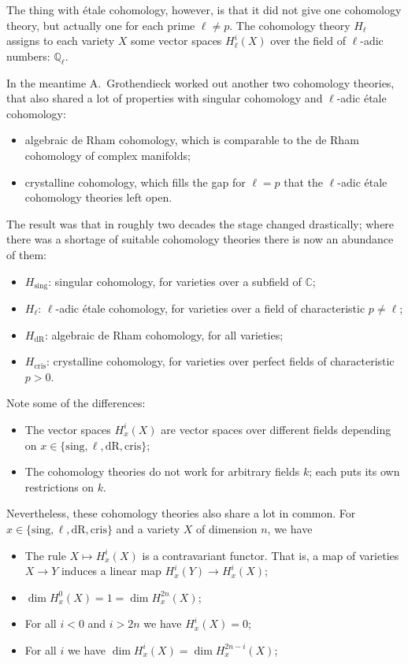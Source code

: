 \documentclass[a4paper,10pt]{article}
\begin{document}
The thing with \'{e}tale cohomology, however, is that it did not give one
cohomology theory, but actually one for each prime $\ell \ne p$. The cohomology
theory $H_{\ell}$ assigns to each variety $X$ some vector spaces
$H_{\ell}^{i}(X)$ over the field of $\ell$-adic numbers: $\mathbb{Q}_{\ell}$.

In the meantime A.~Grothendieck worked out another two cohomology theories,
that also shared a lot of properties with singular cohomology and $\ell$-adic
\'{e}tale cohomology:
\begin{itemize} %
	\item algebraic de Rham cohomology, which is comparable to the de Rham
		cohomology of complex manifolds;
	\item crystalline cohomology, which fills the gap for $\ell = p$ that
		the $\ell$-adic \'{e}tale cohomology theories left open.
\end{itemize} %
The result was that in roughly two decades the stage changed drastically; where
there was a shortage of suitable cohomology theories there is now an abundance
of them:
\begin{itemize} %
	\item $H_{\mathrm{sing}}$: singular cohomology, for varieties over a
		subfield of $\mathbb{C}$;
	\item $H_{\ell}$: $\ell$-adic \'{e}tale cohomology, for varieties over
		a field of characteristic $p \ne \ell$;
	\item $H_{\mathrm{dR}}$: algebraic de Rham cohomology, for all
		varieties;
	\item $H_{\mathrm{cris}}$: crystalline cohomology, for varieties over
		perfect fields of characteristic $p > 0$.
\end{itemize} %
Note some of the differences:
\begin{itemize} %
	\item The vector spaces $H_{x}^{i}(X)$ are vector spaces over different
		fields depending on $x \in \{\mathrm{sing}, \ell, \mathrm{dR},
		\mathrm{cris}\}$;
	\item The cohomology theories do not work for arbitrary fields $k$;
		each puts its own restrictions on $k$.
\end{itemize} %
Nevertheless, these cohomology theories also share a lot in common. For $x \in
\{\mathrm{sing}, \ell, \mathrm{dR}, \mathrm{cris}\}$ and a variety $X$ of
dimension $n$, we have
\begin{itemize} %
	\item The rule $X \mapsto H_{x}^{i}(X)$ is a contravariant functor.
		That is, a map of varieties $X \to Y$ induces a linear map
		$H_{x}^{i}(Y) \to H_{x}^{i}(X)$;
	\item $\dim H_{x}^{0}(X) = 1 = \dim H_{x}^{2n}(X)$;
	\item For all $i < 0$ and $i > 2n$ we have $H_{x}^{i}(X) = 0$;
	\item For all $i$ we have $\dim H_{x}^{i}(X) = \dim H_{x}^{2n-i}(X)$;
\end{itemize} %
\end{document}
